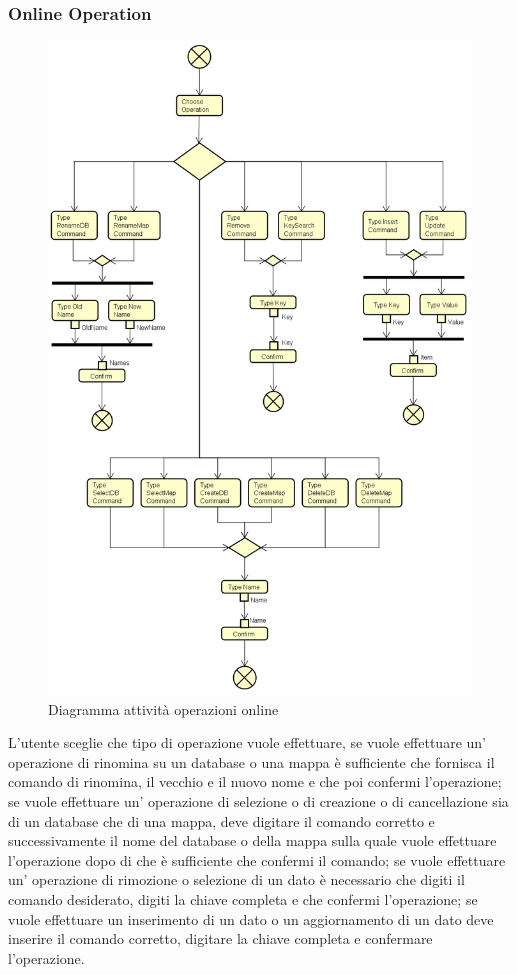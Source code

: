 \documentclass[a4paper]{article}
\begin{document}
		\subsubsection{Online Operation}
			\begin{figure} [H]
				\centering
				\includegraphics[scale=0.4]{ST/client/diagramma-Online-Operation.png}
				\caption{Diagramma attività operazioni online}
			\end{figure}
				L'utente sceglie che tipo di operazione vuole effettuare, se vuole effettuare un' operazione di rinomina su un database o una mappa è sufficiente che fornisca il comando di rinomina, il vecchio e il nuovo nome e che poi confermi l'operazione; se vuole effettuare un' operazione di selezione o di creazione o di cancellazione sia di un database che di una mappa, deve digitare il comando corretto e successivamente il nome del database o della mappa sulla quale vuole effettuare l'operazione dopo di che è sufficiente che confermi il comando; se vuole effettuare un' operazione di rimozione o selezione di un dato è necessario che digiti il comando desiderato, digiti la chiave completa e che confermi l'operazione; se vuole effettuare un inserimento di un dato o un aggiornamento di un dato deve inserire il comando corretto, digitare la chiave completa e confermare l'operazione.
                
\end{document}
